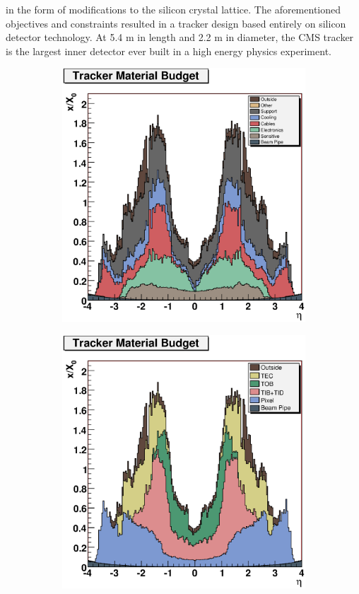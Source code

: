 in the form of modifications to the silicon crystal lattice. 
The aforementioned objectives and constraints resulted in a tracker design 
based entirely on silicon detector technology. 
At 5.4 m in length and 2.2 m in diameter, the CMS tracker is the largest inner
detector ever built in a high energy physics experiment.
\begin{figure}[hb]
  \centering
  \begin{subfigure}[b]{.45\textwidth}
	\includegraphics[width=\textwidth]{images/Tracker_Materials_x_vs_eta.eps} 
	\end{subfigure}	
   \begin{subfigure}[b]{.45\textwidth}
	\includegraphics[width=\textwidth]{images/Tracker_SubDetectors_x_vs_eta.eps}

\end{subfigure}
\end{figure}
